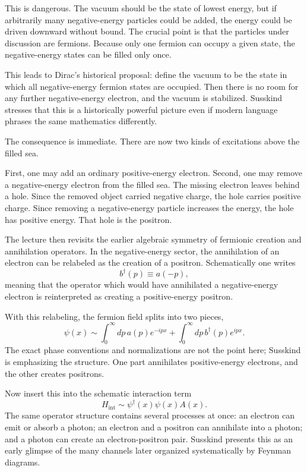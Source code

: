 This is dangerous. The vacuum should be the state of lowest energy, but if arbitrarily many negative-energy particles could be added, the energy could be driven downward without bound. The crucial point is that the particles under discussion are fermions. Because only one fermion can occupy a given state, the negative-energy states can be filled only once.

This leads to Dirac's historical proposal: define the vacuum to be the state in which all negative-energy fermion states are occupied. Then there is no room for any further negative-energy electron, and the vacuum is stabilized. Susskind stresses that this is a historically powerful picture even if modern language phrases the same mathematics differently.

The consequence is immediate. There are now two kinds of excitations above the filled sea.

First, one may add an ordinary positive-energy electron. Second, one may remove a negative-energy electron from the filled sea. The missing electron leaves behind a hole. Since the removed object carried negative charge, the hole carries positive charge. Since removing a negative-energy particle increases the energy, the hole has positive energy. That hole is the positron.

The lecture then revisits the earlier algebraic symmetry of fermionic creation and annihilation operators. In the negative-energy sector, the annihilation of an electron can be relabeled as the creation of a positron. Schematically one writes
\begin{equation}
b^\dagger(p)\equiv a(-p),
\end{equation}
meaning that the operator which would have annihilated a negative-energy electron is reinterpreted as creating a positive-energy positron.

With this relabeling, the fermion field splits into two pieces,
\begin{equation}
\psi(x)\sim \int_0^\infty dp\, a(p)e^{-ipx}
+
\int_0^\infty dp\, b^\dagger(p)e^{ipx}.
\end{equation}
The exact phase conventions and normalizations are not the point here; Susskind is emphasizing the structure. One part annihilates positive-energy electrons, and the other creates positrons.

Now insert this into the schematic interaction term
\begin{equation}
H_{\mathrm{int}}\sim \psi^\dagger(x)\psi(x)A(x).
\end{equation}
The same operator structure contains several processes at once: an electron can emit or absorb a photon; an electron and a positron can annihilate into a photon; and a photon can create an electron-positron pair. Susskind presents this as an early glimpse of the many channels later organized systematically by Feynman diagrams.

